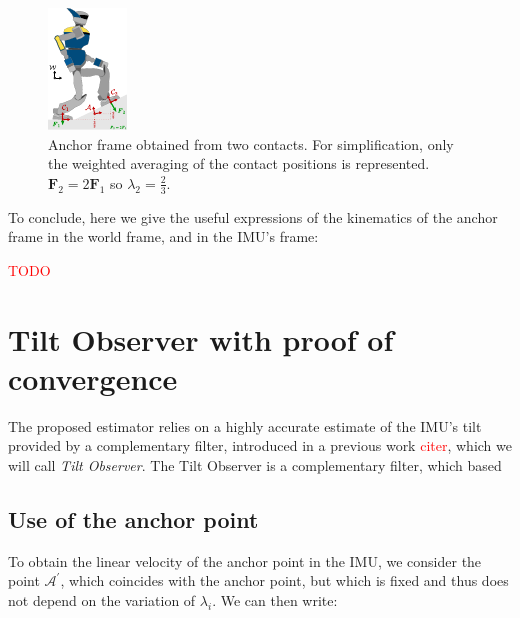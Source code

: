 \documentclass{IJCAS}
\begin{document}
\begin{figure}[!t]
\begin{center}
\includegraphics[width=0.5\columnwidth]{Uploaded/Images/anchorFrame.pdf} 
\vskip -0.5pc
\caption{Anchor frame obtained from two contacts. For simplification, only the weighted averaging of the contact positions is represented. $\boldsymbol{F}_{2} = 2\boldsymbol{F}_{1}$ so $\lambda_{2}=\frac{2}{3}$.}\label{fig:anchorFrame}
\end{center}
\vskip -1.5pc
\end{figure}

To conclude, here we give the useful expressions of the kinematics of the anchor frame in the world frame, and in the IMU's frame:

\textcolor{red}{TODO}

\section{Tilt Observer with proof of convergence}
The proposed estimator relies on a highly accurate estimate of the IMU's tilt provided by a complementary filter, introduced in a previous work \textcolor{red}{citer}, which we will call \emph{Tilt Observer}. The Tilt Observer is a complementary filter, which based 

\subsection{Use of the anchor point}

To obtain the linear velocity of the anchor point in the IMU, we consider the point $\mathcal{A}^{\prime}$, which coincides with the anchor point, but which is fixed and thus does not depend on the variation of $\lambda_{i}$. We can then write:
\end{document}
